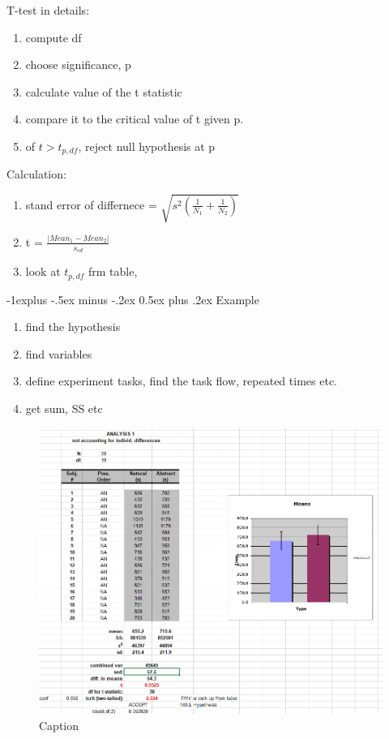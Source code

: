 \documentclass[10pt,landscape]{article}
\makeatletter
\renewcommand{\subsection}{\@startsection{subsection}{2}{0mm}%
                                {-1explus -.5ex minus -.2ex}%
                                {0.5ex plus .2ex}%
                                {\normalfont\normalsize\bfseries}}
\theoremstyle{definition}
\makeatother
\begin{document}
\begin{multicols}{3}
T-test in details:
\begin{enumerate}
    \item compute df
    \item choose significance, p
    \item calculate value of the t statistic
    \item compare it to the critical value of t given p. 
    \item of $t > t_{p, df}$, reject null hypothesis at p
\end{enumerate}
Calculation:

\begin{enumerate}
    \item stand error of differnece = $\sqrt{s^2 (\frac{1}{N_1} + \frac{1}{N_2}) }$
    \item t = $\frac{|Mean_1 - Mean_2|}{s_{ed}}$
    \item look at $t_{p, df}$ frm table, 
\end{enumerate}


\subsection{Example}
\begin{enumerate}
    \item find the hypothesis
    \item find variables
    \item define experiment tasks, find the task flow, repeated times etc. 
    \item get sum, SS etc
\end{enumerate}
\begin{figure}[H]
    \centering
    \includegraphics[width=\linewidth]{t-test.png}
    \caption{Caption}
    \label{fig:my_label}
\end{figure}


\end{multicols}
\end{document}
